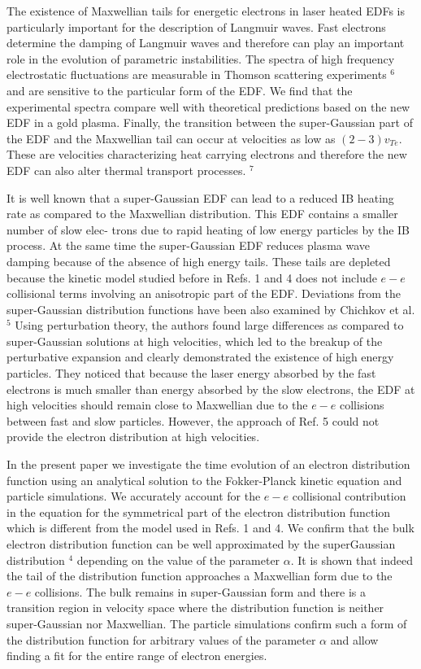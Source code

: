 \documentclass[oneside,onecolumn]{article}
\begin{document}
\begin{sloppypar}
 The existence of Maxwellian tails for energetic electrons in laser heated EDFs is particularly important for the description of Langmuir waves. Fast electrons determine the damping of Langmuir waves and therefore can play an important role in the evolution of parametric instabilities. The spectra of high frequency electrostatic fluctuations are measurable in Thomson scattering experiments ${ }^{6}$ and are sensitive to the particular form of the EDF. We find that the experimental spectra compare well with theoretical predictions based on the new EDF in a gold plasma. Finally, the transition between the super-Gaussian part of the EDF and the Maxwellian tail can occur at velocities as low as $(2-3) v_{T e}$. These are velocities characterizing heat carrying electrons and therefore the new EDF can also alter thermal transport processes. ${ }^{7}$
 
 It is well known that a super-Gaussian EDF can lead to a reduced IB heating rate as compared to the Maxwellian distribution. This EDF contains a smaller number of slow elec- trons due to rapid heating of low energy particles by the IB process. At the same time the super-Gaussian EDF reduces plasma wave damping because of the absence of high energy tails. These tails are depleted because the kinetic model studied before in Refs. 1 and 4 does not include $e-e$ collisional terms involving an anisotropic part of the EDF. Deviations from the super-Gaussian distribution functions have been also examined by Chichkov et al. ${ }^{5}$ Using perturbation theory, the authors found large differences as compared to super-Gaussian solutions at high velocities, which led to the breakup of the perturbative expansion and clearly demonstrated the existence of high energy particles. They noticed that because the laser energy absorbed by the fast electrons is much smaller than energy absorbed by the slow electrons, the EDF at high velocities should remain close to Maxwellian due to the $e-e$ collisions between fast and slow particles. However, the approach of Ref. 5 could not provide the electron distribution at high velocities.
 
 In the present paper we investigate the time evolution of an electron distribution function using an analytical solution to the Fokker-Planck kinetic equation and particle simulations. We accurately account for the $e-e$ collisional contribution in the equation for the symmetrical part of the electron distribution function which is different from the model used in Refs. 1 and 4. We confirm that the bulk electron distribution function can be well approximated by the superGaussian distribution ${ }^{4}$ depending on the value of the parameter $\alpha$. It is shown that indeed the tail of the distribution function approaches a Maxwellian form due to the $e-e$ collisions. The bulk remains in super-Gaussian form and there is a transition region in velocity space where the distribution function is neither super-Gaussian nor Maxwellian. The particle simulations confirm such a form of the distribution function for arbitrary values of the parameter $\alpha$ and allow finding a fit for the entire range of electron energies.
 

\end{sloppypar}
\end{document}
